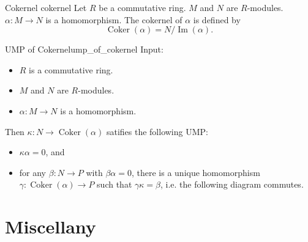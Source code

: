 \documentclass{article}
\begin{document}
\begin{definition}{Cokernel }{cokernel}
    Let $R$ be a commutative ring.
    $M$ and $N$ are $R$-modules.
    $\alpha: M\rightarrow N$ is a homomorphism.
    The cokernel of $\alpha$ is defined by
    \[ \operatorname{Coker}(\alpha) = N/\operatorname{Im}(\alpha). \]
\end{definition}

\begin{proposition}{UMP of Cokernel}{ump_of_cokernel}
    Input:
    \begin{itemize}
        \item $R$ is a commutative ring.
        \item $M$ and $N$ are $R$-modules.
        \item $\alpha: M\rightarrow N$ is a homomorphism.
    \end{itemize}
    Then $\kappa: N \rightarrow \operatorname{Coker}(\alpha)$ satifies the following UMP:
    \begin{itemize}
        \item $\kappa \alpha = 0$, and
        \item for any $\beta: N\rightarrow P$ with $\beta \alpha = 0$, there is a unique homomorphism $\gamma: \operatorname{Coker}(\alpha) \rightarrow P$ such that $\gamma \kappa = \beta$, i.e. the following diagram commutes.
    \end{itemize}
    \begin{center}
    \end{center}
\end{proposition}

\section*{Miscellany}
\end{document}
